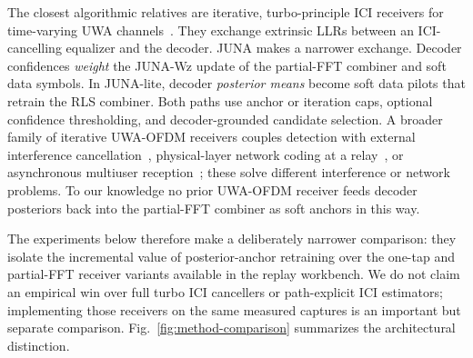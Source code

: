 \documentclass[journal]{IEEEtran}
\newcommand{\juna}{JUNA}
\newcommand{\junalite}{JUNA-lite}
\newcommand{\junawz}{JUNA-Wz}
\begin{document}
The closest algorithmic relatives are iterative, turbo-principle ICI receivers
for time-varying UWA channels~\cite{jhuang2011progressive,jhuang2010iterative}.
They exchange extrinsic LLRs between an ICI-cancelling equalizer and the decoder.
\juna{} makes a narrower exchange. Decoder confidences \emph{weight} the
\junawz{} update of the partial-FFT combiner and soft data symbols. In
\junalite{}, decoder \emph{posterior means} become soft data pilots that retrain
the RLS combiner. Both paths use anchor or iteration caps, optional confidence
thresholding, and decoder-grounded candidate selection. A
broader family of iterative UWA-OFDM receivers couples detection with external
interference cancellation~\cite{zwang2012partialband}, physical-layer network
coding at a relay~\cite{zwang2013plnc}, or asynchronous multiuser
reception~\cite{zwang2013async}; these solve different interference or network
problems. To our knowledge no prior UWA-OFDM receiver feeds decoder posteriors
back into the partial-FFT combiner as soft anchors in this way.

The experiments below therefore make a deliberately narrower comparison: they
isolate the incremental value of posterior-anchor retraining over the one-tap
and partial-FFT receiver variants available in the replay workbench. We do not
claim an empirical win over full turbo ICI cancellers or path-explicit ICI
estimators; implementing those receivers on the same measured captures is an
important but separate comparison. Fig.~\ref{fig:method-comparison} summarizes
the architectural distinction.
\end{document}
